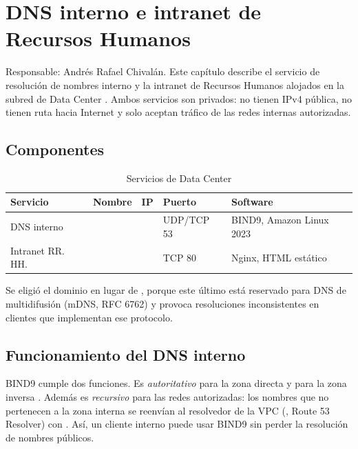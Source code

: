 \chapter{DNS interno e intranet de Recursos Humanos}

Responsable: Andrés Rafael Chivalán. Este capítulo describe el servicio de resolución de
nombres interno y la intranet de Recursos Humanos alojados en la subred de Data Center
. Ambos servicios son privados: no tienen IPv4 pública, no tienen ruta
hacia Internet y solo aceptan tráfico de las redes internas autorizadas.

\section{Componentes}

\begin{table}[H]
\centering
\caption{Servicios de Data Center}
\small
\begin{tabularx}{\textwidth}{>{\raggedright\arraybackslash}p{2.5cm}p{4.3cm}p{2.1cm}>{\raggedright\arraybackslash}p{2.0cm}Y}
\toprule
\textbf{Servicio} & \textbf{Nombre} & \textbf{IP} & \textbf{Puerto} & \textbf{Software} \\
\midrule
DNS interno &  &  & UDP/TCP 53 & BIND9, Amazon Linux 2023 \\
Intranet RR. HH. &  &  & TCP 80 & Nginx, HTML estático \\
\bottomrule
\end{tabularx}
\end{table}

Se eligió el dominio  en lugar de , porque este último está
reservado para DNS de multidifusión (mDNS, RFC 6762) y provoca resoluciones inconsistentes en
clientes que implementan ese protocolo.

\section{Funcionamiento del DNS interno}

BIND9 cumple dos funciones. Es \emph{autoritativo} para la zona directa
 y para la zona inversa . Además es
\emph{recursivo} para las redes autorizadas: los nombres que no pertenecen a la zona interna se
reenvían al resolvedor de la VPC (, Route 53 Resolver) con
. Así, un cliente interno puede usar BIND9 sin perder la resolución de
nombres públicos.

